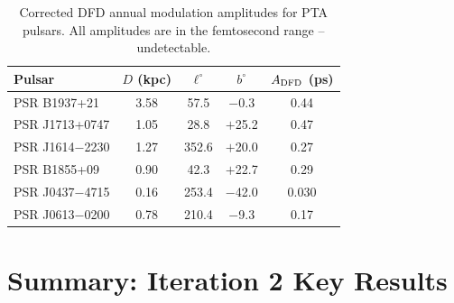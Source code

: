 \documentclass[aps,prd,twocolumn,superscriptaddress,nofootinbib]{revtex4-2}
\begin{document}
\begin{table}[h]
\caption{Corrected DFD annual modulation amplitudes for PTA pulsars.
All amplitudes are in the femtosecond range -- undetectable.}
\label{tab:pta_corrected}
\begin{ruledtabular}
\begin{tabular}{lcccc}
Pulsar & $D$ (kpc) & $\ell^\circ$ & $b^\circ$ &
  $A_{\rm DFD}$ (ps) \\
\hline
PSR B1937+21 & 3.58 & 57.5 & $-$0.3 & 0.44 \\
PSR J1713+0747 & 1.05 & 28.8 & $+$25.2 & 0.47 \\
PSR J1614$-$2230 & 1.27 & 352.6 & $+$20.0 & 0.27 \\
PSR B1855+09 & 0.90 & 42.3 & $+$22.7 & 0.29 \\
PSR J0437$-$4715 & 0.16 & 253.4 & $-$42.0 & 0.030 \\
PSR J0613$-$0200 & 0.78 & 210.4 & $-$9.3 & 0.17 \\
\end{tabular}
\end{ruledtabular}
\end{table}

\section*{Summary: Iteration 2 Key Results}
\end{document}
